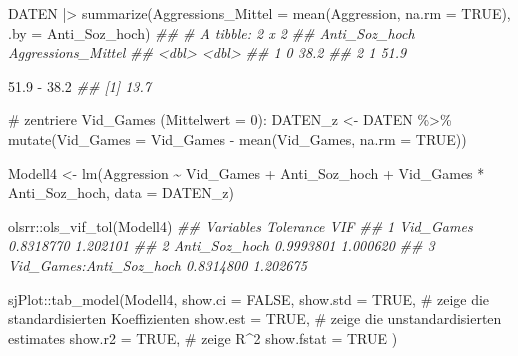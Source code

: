 \documentclass[
  10pt,
  letterpaper,
  a4paper, twoside]{scrreprt}
\newenvironment{Shaded}{\begin{snugshade}}{\end{snugshade}}
\newcommand{\AttributeTok}[1]{\textcolor[rgb]{0.40,0.45,0.13}{#1}}
\newcommand{\CommentTok}[1]{\textcolor[rgb]{0.37,0.37,0.37}{#1}}
\newcommand{\ConstantTok}[1]{\textcolor[rgb]{0.56,0.35,0.01}{#1}}
\newcommand{\DocumentationTok}[1]{\textcolor[rgb]{0.37,0.37,0.37}{\textit{#1}}}
\newcommand{\FloatTok}[1]{\textcolor[rgb]{0.68,0.00,0.00}{#1}}
\newcommand{\FunctionTok}[1]{\textcolor[rgb]{0.28,0.35,0.67}{#1}}
\newcommand{\NormalTok}[1]{\textcolor[rgb]{0.00,0.23,0.31}{#1}}
\newcommand{\OtherTok}[1]{\textcolor[rgb]{0.00,0.23,0.31}{#1}}
\newcommand{\SpecialCharTok}[1]{\textcolor[rgb]{0.37,0.37,0.37}{#1}}
\begin{document}
\begin{Shaded}
\begin{Highlighting}[]
\NormalTok{DATEN }\SpecialCharTok{|\textgreater{}}
  \FunctionTok{summarize}\NormalTok{(}\AttributeTok{Aggressions\_Mittel =} \FunctionTok{mean}\NormalTok{(Aggression, }\AttributeTok{na.rm =} \ConstantTok{TRUE}\NormalTok{), }\AttributeTok{.by =}\NormalTok{ Anti\_Soz\_hoch) }
\DocumentationTok{\#\# \# A tibble: 2 x 2}
\DocumentationTok{\#\#   Anti\_Soz\_hoch Aggressions\_Mittel}
\DocumentationTok{\#\#           \textless{}dbl\textgreater{}              \textless{}dbl\textgreater{}}
\DocumentationTok{\#\# 1             0               38.2}
\DocumentationTok{\#\# 2             1               51.9}

\FloatTok{51.9} \SpecialCharTok{{-}} \FloatTok{38.2}
\DocumentationTok{\#\# [1] 13.7}

\CommentTok{\# zentriere Vid\_Games (Mittelwert = 0):}
\NormalTok{DATEN\_z }\OtherTok{\textless{}{-}}\NormalTok{ DATEN }\SpecialCharTok{\%\textgreater{}\%} 
  \FunctionTok{mutate}\NormalTok{(}\AttributeTok{Vid\_Games =}\NormalTok{ Vid\_Games }\SpecialCharTok{{-}} \FunctionTok{mean}\NormalTok{(Vid\_Games, }\AttributeTok{na.rm =} \ConstantTok{TRUE}\NormalTok{)) }

\NormalTok{Modell4 }\OtherTok{\textless{}{-}} \FunctionTok{lm}\NormalTok{(Aggression }\SpecialCharTok{\textasciitilde{}}\NormalTok{ Vid\_Games }\SpecialCharTok{+} 
\NormalTok{                            Anti\_Soz\_hoch }\SpecialCharTok{+} 
\NormalTok{                            Vid\_Games }\SpecialCharTok{*}\NormalTok{ Anti\_Soz\_hoch,}
                            \AttributeTok{data =}\NormalTok{ DATEN\_z)}

\NormalTok{olsrr}\SpecialCharTok{::}\FunctionTok{ols\_vif\_tol}\NormalTok{(Modell4)}
\DocumentationTok{\#\#                 Variables Tolerance      VIF}
\DocumentationTok{\#\# 1               Vid\_Games 0.8318770 1.202101}
\DocumentationTok{\#\# 2           Anti\_Soz\_hoch 0.9993801 1.000620}
\DocumentationTok{\#\# 3 Vid\_Games:Anti\_Soz\_hoch 0.8314800 1.202675}

\NormalTok{sjPlot}\SpecialCharTok{::}\FunctionTok{tab\_model}\NormalTok{(Modell4, }
                  \AttributeTok{show.ci =} \ConstantTok{FALSE}\NormalTok{,}
                  \AttributeTok{show.std =} \ConstantTok{TRUE}\NormalTok{, }\CommentTok{\# zeige die standardisierten Koeffizienten}
                  \AttributeTok{show.est =} \ConstantTok{TRUE}\NormalTok{, }\CommentTok{\# zeige die unstandardisierten estimates}
                  \AttributeTok{show.r2 =} \ConstantTok{TRUE}\NormalTok{, }\CommentTok{\# zeige R\^{}2}
                  \AttributeTok{show.fstat =} \ConstantTok{TRUE}
\NormalTok{                  )}
\end{Highlighting}
\end{Shaded}
\end{document}
